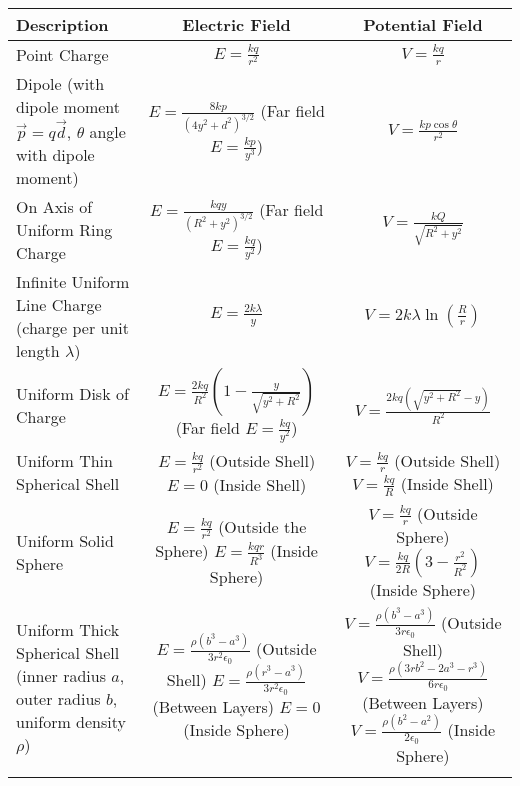 \begin{center}
	\begin{tabular}{m{4cm} c c}
		\centering Description & Electric Field & Potential Field \\ \hline \hline \noalign{\smallskip}
		\centering Point Charge & $E = \frac{kq}{r^2}$ & $V = \frac{kq}{r}$\\[3pt]  \hline \noalign{\smallskip}
		\centering Dipole (with dipole moment $\vec p = q\vec d$, $\theta$ angle with dipole moment) & \makecell{$E = \frac{8kp}{(4y^2 + d^2)^{3/2}}$ \\(Far field $E = \frac{kp}{y^3}$)}& $V = \frac{kp\cos \theta}{r^2}$\\[3pt]  \hline \noalign{\smallskip}
		\centering On Axis of Uniform Ring Charge & \makecell{$E = \frac{kqy}{(R^2 + y^2)^{3/2}}$\\(Far field $E = \frac{kq}{y^2}$)} & $V = \frac{kQ}{\sqrt{R^2 + y^2}}$\\[3pt]  \hline \noalign{\smallskip}
		\centering Infinite Uniform Line Charge (charge per unit length $\lambda$)& $E = \frac{2k \lambda}{y}$& $V = 2k\lambda \ln \left(\frac{R}{r} \right)$\\[3pt]  \hline \noalign{\smallskip}
		\centering Uniform Disk of Charge & \makecell{$E = \frac{2kq}{R^2}\left(1-\frac{y}{\sqrt{y^2+R^2}}\right)$ \\(Far field $E = \frac{kq}{y^2}$)}& $V = \frac{2kq(\sqrt{y^2+R^2}-y)}{R^2}$\\[3pt]  \hline \noalign{\smallskip}
		\centering Uniform Thin Spherical Shell&\makecell{$E= \frac{kq}{r^2}$ (Outside Shell)\\ $E=0$ (Inside Shell)}&\makecell{$V= \frac{kq}{r}$ (Outside Shell)\\ $V= \frac{kq}{R}$ (Inside Shell)}\\[3pt]  \hline \noalign{\smallskip}
		\centering Uniform Solid Sphere& \makecell{$E= \frac{kq}{r^2}$ (Outside the Sphere)\\ $E=\frac{kqr}{R^3}$ (Inside Sphere)} &\makecell{$V= \frac{kq}{r}$ (Outside Sphere)\\ $V=\frac{kq}{2R}\left(3 - \frac{r^2}{R^2}\right)$ (Inside Sphere)}\\[3pt]  \hline \noalign{\smallskip}
		\centering Uniform Thick Spherical Shell (inner radius $a$, outer radius $b$, uniform density $\rho$)& \makecell{$E= \frac{\rho(b^3-a^3)}{3r^2 \epsilon_0}$ (Outside Shell)\\ $E=\frac{\rho(r^3-a^3)}{3r^2 \epsilon_0}$ (Between Layers) \\ $E=0$ (Inside Sphere)} & \makecell{$V= \frac{\rho(b^3-a^3)}{3r \epsilon_0}$ (Outside Shell)\\ $V = \frac{\rho(3rb^2 - 2a^3 - r^3)}{6r\epsilon_0}$ (Between Layers) \\ $V=\frac{\rho(b^2-a^2)}{2\epsilon_0}$ (Inside Sphere)} \\[3pt]  \hline \noalign{\smallskip}

\end{tabular}
\end{center}
